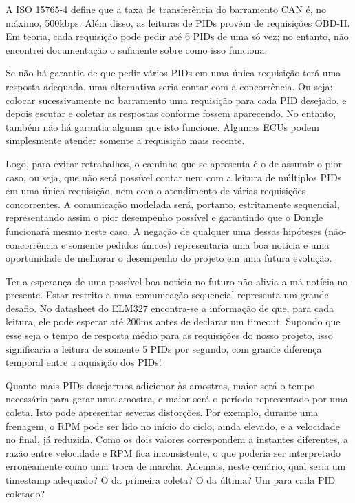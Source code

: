 \documentclass[12pt]{article}
\begin{document}
A ISO 15765-4 define que a taxa de transferência do barramento CAN é, no máximo, 500kbps. Além disso, as leituras de PIDs provém de requisições OBD-II. Em teoria, cada requisição pode pedir até 6 PIDs de uma só vez; no entanto, não encontrei documentação o suficiente sobre como isso funciona.

Se não há garantia de que pedir vários PIDs em uma única requisição terá uma resposta adequada, uma alternativa seria contar com a concorrência. Ou seja: colocar sucessivamente no barramento uma requisição para cada PID desejado, e depois escutar e coletar as respostas conforme fossem aparecendo. No entanto, também não há garantia alguma que isto funcione. Algumas ECUs podem simplesmente atender somente a requisição mais recente. 

Logo, para evitar retrabalhos, o caminho que se apresenta é o de assumir o pior caso, ou seja, que não será possível contar nem com a leitura de múltiplos PIDs em uma única requisição, nem com o atendimento de várias requisições concorrentes. A comunicação modelada será, portanto, estritamente sequencial, representando assim o pior desempenho possível e garantindo que o Dongle funcionará mesmo neste caso. A negação de qualquer uma dessas hipóteses (não-concorrência e somente pedidos únicos) representaria uma boa notícia e uma oportunidade de melhorar o desempenho do projeto em uma futura evolução.

Ter a esperança de uma possível boa notícia no futuro não alivia a má notícia no presente. Estar restrito a uma comunicação sequencial representa um grande desafio. No datasheet do ELM327 encontra-se a informação de que, para cada leitura, ele pode esperar até 200ms antes de declarar um timeout. Supondo que esse seja o tempo de resposta médio para as requisições do nosso projeto, isso significaria a leitura de somente 5 PIDs por segundo, com grande diferença temporal entre a aquisição dos PIDs!

Quanto mais PIDs desejarmos adicionar às amostras, maior será o tempo necessário para gerar uma amostra, e maior será o período representado por uma coleta. Isto pode apresentar severas distorções. Por exemplo, durante uma frenagem, o RPM pode ser lido no início do ciclo, ainda elevado, e a velocidade no final, já reduzida. Como os dois valores correspondem a instantes diferentes, a razão entre velocidade e RPM fica inconsistente, o que poderia ser interpretado erroneamente como uma troca de marcha. Ademais, neste cenário, qual seria um timestamp adequado? O da primeira coleta? O da última? Um para cada PID coletado?
\end{document}
